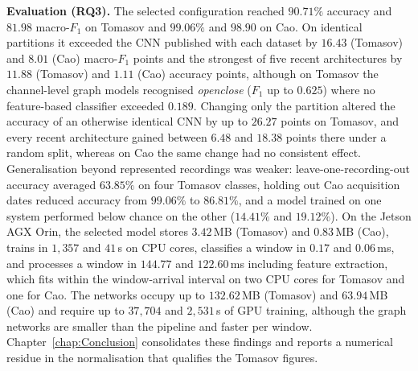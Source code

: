 \textbf{Evaluation (RQ3).} The selected configuration reached $90.71\%$ accuracy and $81.98$ macro-$F_1$ on Tomasov and $99.06\%$ and $98.90$ on Cao. On identical partitions it exceeded the CNN published with each dataset by $16.43$ (Tomasov) and $8.01$ (Cao) macro-$F_1$ points and the strongest of five recent architectures by $11.88$ (Tomasov) and $1.11$ (Cao) accuracy points, although on Tomasov the channel-level graph models recognised \emph{openclose} ($F_1$ up to $0.625$) where no feature-based classifier exceeded $0.189$. Changing only the partition altered the accuracy of an otherwise identical CNN by up to $26.27$ points on Tomasov, and every recent architecture gained between $6.48$ and $18.38$ points there under a random split, whereas on Cao the same change had no consistent effect. Generalisation beyond represented recordings was weaker: leave-one-recording-out accuracy averaged $63.85\%$ on four Tomasov classes, holding out Cao acquisition dates reduced accuracy from $99.06\%$ to $86.81\%$, and a model trained on one system performed below chance on the other ($14.41\%$ and $19.12\%$). On the Jetson AGX Orin, the selected model stores $3.42$\,MB (Tomasov) and $0.83$\,MB (Cao), trains in $1{,}357$ and $41$\,s on CPU cores, classifies a window in $0.17$ and $0.06$\,ms, and processes a window in $144.77$ and $122.60$\,ms including feature extraction, which fits within the window-arrival interval on two CPU cores for Tomasov and one for Cao. The networks occupy up to $132.62$\,MB (Tomasov) and $63.94$\,MB (Cao) and require up to $37{,}704$ and $2{,}531$\,s of GPU training, although the graph networks are smaller than the pipeline and faster per window. Chapter~\ref{chap:Conclusion} consolidates these findings and reports a numerical residue in the normalisation that qualifies the Tomasov figures.
